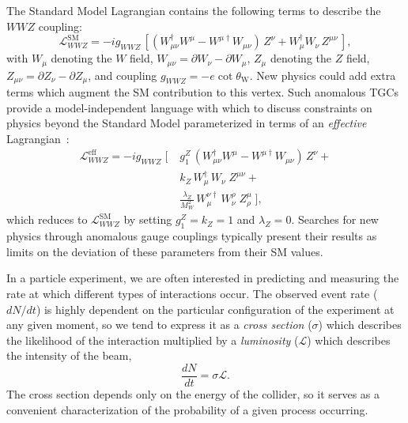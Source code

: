 The Standard Model Lagrangian contains the following terms to describe the $WWZ$ coupling:
\begin{equation}
  \label{eq:sm-tgc-lagrangian}
  \mathcal{L}_{WWZ}^\text{SM} = -i g_{WWZ}\, \left[(W_{\mu\nu}^\dag W^\mu - W^{\mu\dag}W_{\mu\nu})\, Z^\nu + W_\mu^\dag W_\nu\, Z^{\mu\nu} \,\right],
\end{equation}
with $W_\mu$ denoting the $W$ field, $W_{\mu\nu} = \partial W_\nu - \partial W_\mu$, $Z_\mu$ denoting the $Z$ field, $Z_{\mu\nu} = \partial Z_\nu - \partial Z_\mu$, and coupling $g_{WWZ} = -e \cot{\theta_\text{W}}$.  New physics could add extra terms which augment the SM contribution to this vertex.  Such anomalous TGCs provide a model-independent language with which to discuss constraints on physics beyond the Standard Model parameterized in terms of an \emph{effective} Lagrangian~\cite{Hagiwara:1986vm,doi:10.1146/annurev-nucl-102010-130106}:
\begin{align}
  \mathcal{L}_{WWZ}^\text{eff} = -i g_{WWZ}\; \Big[\;
  & g_1^Z\, (W_{\mu\nu}^\dag W^\mu - W^{\mu\dag}W_{\mu\nu})\, Z^\nu + \nonumber\\
  & k_Z\, W_\mu^\dag\, W_\nu\; Z^{\mu\nu} + \\
  & \frac{\lambda_Z}{M_W^2}\, W_\mu^{\nu\dagger}\, W_\nu^\rho\; Z_\rho^\mu\; \Big],\nonumber
\end{align}
which reduces to $\mathcal{L}_{WWZ}^\text{SM}$ by setting $g_1^Z = k_Z = 1$ and $\lambda_Z = 0$.  Searches for new physics through anomalous gauge couplings typically present their results as limits on the deviation of these parameters from their SM values.


In a particle experiment, we are often interested in predicting and measuring the rate at which different types of interactions occur.  The observed event rate ($dN/dt$) is highly dependent on the particular configuration of the experiment at any given moment, so we tend to express it as a \emph{cross section} ($\sigma$) which describes the likelihood of the interaction multiplied by a \emph{luminosity} ($\mathcal{L}$) which describes the intensity of the beam,
\begin{equation}
  \label{eq:cross-section}
  \frac{dN}{dt} = \sigma\mathcal{L}.
\end{equation}
The cross section depends only on the energy of the collider, so it serves as a convenient characterization of the probability of a given process occurring.

